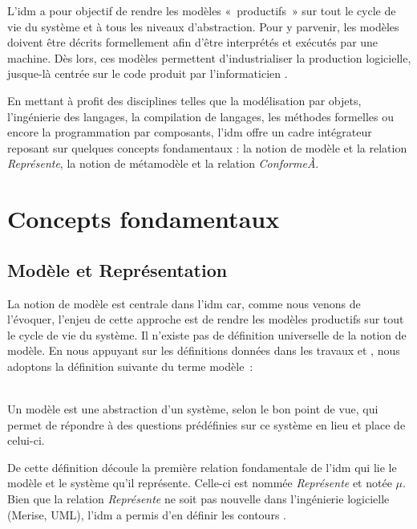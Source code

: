 L'\gls{idm} a pour objectif de rendre les modèles «~productifs~» sur tout le cycle de 
vie du système et à tous les niveaux d'abstraction. Pour y parvenir, les modèles 
doivent être décrits formellement afin d'être interprétés et exécutés par une 
machine. Dès lors, ces modèles permettent d'industrialiser la production 
logicielle, jusque-là centrée sur le code produit par l'informaticien 
\cite{bezivin2005unification}.

En mettant à profit des disciplines telles que la modélisation par objets, 
l'ingénierie des langages, la compilation de langages, les méthodes formelles ou encore la programmation par composants, l'\gls{idm} offre un cadre intégrateur reposant 
sur quelques concepts fondamentaux : la notion de modèle et la relation 
\textit{Représente}, la notion de métamodèle et la relation 
\textit{ConformeÀ}.

\section{Concepts fondamentaux}
\subsection{Modèle et Représentation}
La notion de modèle est centrale dans l'\gls{idm} car, comme nous venons de l'évoquer, 
l'enjeu de cette approche est de rendre les modèles productifs sur tout le cycle 
de vie du système. Il n'existe pas de définition universelle de la notion de 
modèle. En nous appuyant sur les définitions données dans les travaux 
\cite{minsky1967computation} \cite{bezivin2001towards} et 
\cite{seidewitz2003models}, nous adoptons la définition suivante du terme modèle~:
\\\

\begin{definition}
Un modèle est une abstraction d'un système, selon le bon point de vue, qui 
permet de répondre à des questions prédéfinies sur ce système en lieu et place 
de celui-ci.
\end{definition}

De cette définition découle la première relation fondamentale de l'\gls{idm} qui lie 
le modèle et le système qu'il représente. Celle-ci est nommée 
\textit{Représente} et notée $\mu$. Bien que la relation 
\textit{Représente} ne soit pas nouvelle dans l'ingénierie logicielle 
(Merise, UML), l'\gls{idm} a permis d'en définir les contours \cite{atkinson2003model} 
\cite{seidewitz2003models} \cite{bezivin2004search}.

